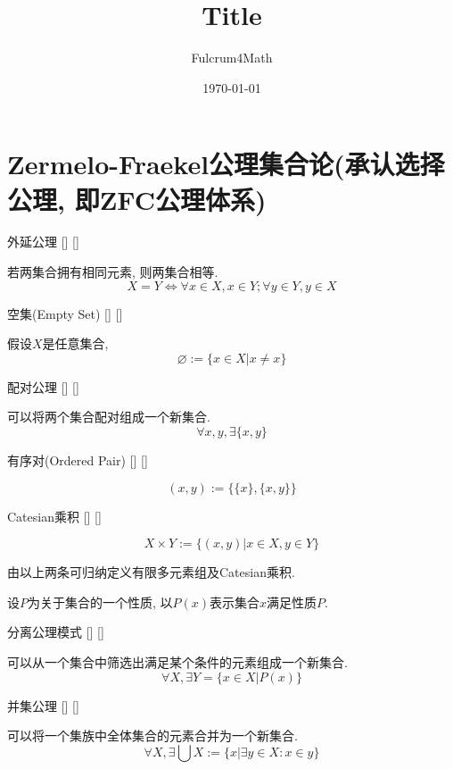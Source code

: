 \documentclass[UTF8]{ctexart}
\title{Title}
\author{Fulcrum4Math}
\date{\today}
\begin{document}
\section{Zermelo-Fraekel公理集合论(承认选择公理, 即ZFC公理体系)}

    \begin{axm}
        []
        {外延公理}
        []
        []


        若两集合拥有相同元素, 则两集合相等. 
        \[X=Y\Longleftrightarrow\forall x\in X, x\in Y; \forall y\in Y, y\in X\]
    \end{axm}
    
    \begin{dfn}
        []
        {空集(Empty Set)}
        []
        []


        假设$X$是任意集合, 
        \[\varnothing:=\{x\in X|x\neq x\}\]
    \end{dfn}
    
    \begin{axm}
        []
        {配对公理}
        []
        []


        可以将两个集合配对组成一个新集合. 
        \[\forall x,y, \exists\{x,y\}\]
    \end{axm}
    
    \begin{dfn}
        []
        {有序对(Ordered Pair)}
        []
        []

        \[(x,y):=\{\{x\},\{x,y\}\}\]
    \end{dfn}
    
    \begin{dfn}
        []
        {Catesian乘积}
        []
        []

        \[X\times Y:=\{(x,y)|x\in X, y\in Y\}\]
    \end{dfn}

    由以上两条可归纳定义有限多元素组及Catesian乘积. 

    \begin{dfn}
        {}
        设$P$为关于集合的一个性质, 以$P(x)$表示集合$x$满足性质$P$. 
    \end{dfn}
    
    \begin{axm}
        []
        {分离公理模式}
        []
        []


        可以从一个集合中筛选出满足某个条件的元素组成一个新集合. 
        \[\forall X, \exists Y=\{x\in X|P(x)\}\]
    \end{axm}
    
    \begin{axm}
        []
        {并集公理}
        []
        []


        可以将一个集族中全体集合的元素合并为一个新集合. 
        \[\forall X, \exists\bigcup X:=\{x|\exists y\in X: x\in y\}\]
    \end{axm}
    
\end{document}
